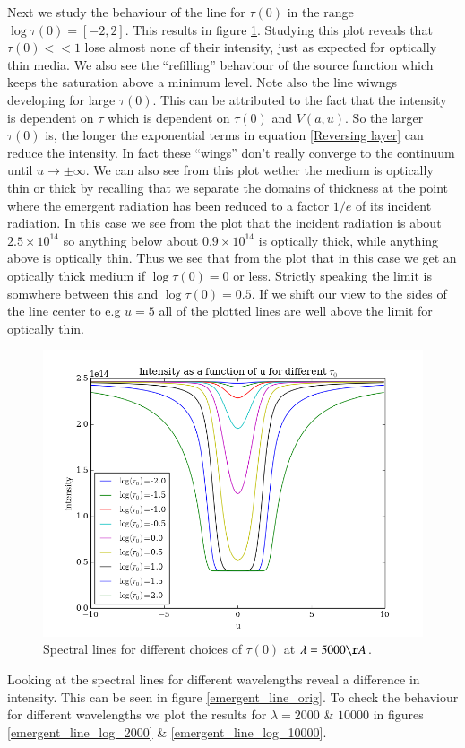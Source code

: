 \documentclass{aa}   %
\begin{document}
Next we study the behaviour of the line for $\tau(0)$ in the range $\log \tau(0) = [-2, 2]$.
This results in figure \ref{emergent_line_log_5000}. Studying this plot reveals that $\tau(0)<<1$ lose almost none of their intensity, just as expected for optically thin media. We also see the ``refilling'' behaviour of the source function which keeps the saturation above a minimum level. Note also the line wiwngs developing for large $\tau(0)$. This can be attributed to the fact that the intensity is dependent on $\tau$ which is dependent on $\tau(0)$ and $V(a,u)$. So the larger $\tau(0)$ is, the longer the exponential terms in equation \ref{Reversing layer} can reduce the intensity. In fact these ``wings'' don't really converge to the continuum until $u \rightarrow \pm \infty$. We can also see from this plot wether the medium is optically thin or thick by recalling that we separate the domains of thickness at the point where the emergent radiation has been reduced to a factor $1/e$ of its incident radiation. In this case we see from the plot that the incident radiation is about $2.5\times 10^{14}$ so anything below about $0.9\times 10^14$ is optically thick, while anything above is optically thin.
Thus we see that from the plot that in this case we get an optically thick medium if $\log \tau(0)= 0$ or less. Strictly
speaking the limit is somwhere between this and $\log \tau(0) = 0.5$. If we shift our view to the sides of the line center to e.g $ u = 5$ all of the plotted lines are well above the limit for optically thin.
\begin{figure}
 \includegraphics[width=.49\textwidth]{emergent_line_log_5000.png}
 \caption{Spectral lines for different choices of $\tau(0)$ at $\lambda = 5000 \AA$.}
 \label{emergent_line_log_5000} 
\end{figure}

Looking at the spectral lines for different wavelengths reveal a difference in intensity. This can be seen in figure \ref{emergent_line_orig}.
To check the behaviour for different wavelengths we plot the results for $\lambda = 2000$ \& $10000$ in figures  \ref{emergent_line_log_2000} $\&$ \ref{emergent_line_log_10000}.
\end{document}
